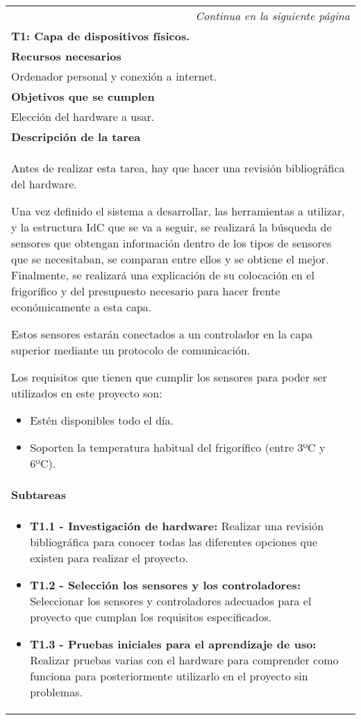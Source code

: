 \begin{longtable}{|p{}|}
\hline
\endfirsthead
\endhead
\hline \multicolumn{1}{r}{\textit{Continua en la siguiente página}} \\
\endfoot
\endlastfoot
    \rowcolor[gray]{.5}
    {\color{white}\textbf{T1: Capa de dispositivos físicos.}} \\
    \hline
    \rowcolor[gray]{.9}
    \textbf{Recursos necesarios} \\
    \hline
    Ordenador personal y conexión a internet. \\
    \hline
    \rowcolor[gray]{.9}
    \textbf{Objetivos que se cumplen}\\
    \hline
    Elección del hardware a usar.\\
    \hline
    \rowcolor[gray]{.9}
    \textbf{Descripción de la tarea}\\
    \hline
    Antes de realizar esta tarea, hay que hacer una revisión bibliográfica del hardware.

    Una vez definido el sistema a desarrollar, las herramientas a utilizar, y la estructura IdC que se va a seguir, se realizará la búsqueda de sensores que obtengan información dentro de los tipos de sensores que se necesitaban, se comparan entre ellos y se obtiene el mejor. Finalmente, se realizará una explicación de su colocación en el frigorífico y del presupuesto necesario para hacer frente económicamente a esta capa.
    
    Estos sensores estarán conectados a un controlador en la capa superior mediante un protocolo de comunicación.
    
    Los requisitos que tienen que cumplir los sensores para poder ser utilizados en este proyecto son:
    
    \begin{itemize}
        \item Estén disponibles todo el día.
        \item Soporten la temperatura habitual del frigorífico (entre 3ºC y 6ºC).
    \end{itemize} \\
    \hline
    \rowcolor[gray]{.9}
    \textbf{Subtareas} \\
    \hline
    \begin{itemize}
        \item \textbf{T1.1 - Investigación de hardware:} Realizar una revisión bibliográfica para conocer todas las diferentes opciones que existen para realizar el proyecto.
        \item \textbf{T1.2 - Selección los sensores y los controladores:} Seleccionar los sensores y controladores adecuados para el proyecto que cumplan los requisitos especificados.
        \item \textbf{T1.3 - Pruebas iniciales para el aprendizaje de uso:} Realizar pruebas varias con el hardware para comprender como funciona para posteriormente utilizarlo en el proyecto sin problemas.
    \end{itemize} \\
    \hline
\end{longtable}

